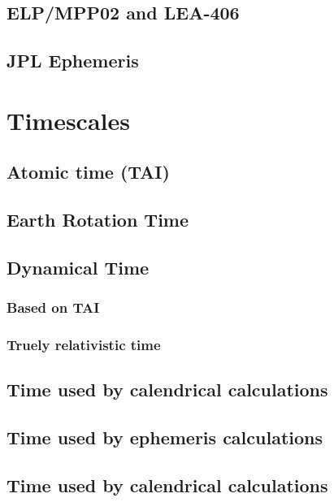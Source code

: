 \documentclass[%
a4paper,%
pagesize,%
12pt,%
parskip=off,%
bibliography=totoc,%
numbers=noenddot,%
DIV=12,%
twoside=semi,%
headings=small,%
]{scrartcl}
\begin{document}
\subsection{ELP/MPP02 and LEA-406}

\subsection{JPL Ephemeris}


\section{Timescales}

\subsection{Atomic time (TAI)}

\subsection{Earth Rotation Time}

\subsection{Dynamical Time}

\subsubsection{Based on TAI}

\subsubsection{Truely relativistic time}

\subsection{Time used by calendrical calculations}

\subsection{Time used by ephemeris calculations}

\subsection{Time used by calendrical calculations}
\end{document}
